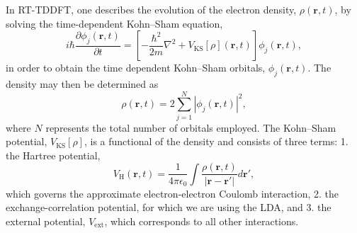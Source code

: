 \documentclass[%
 reprint,
 amsmath,amssymb,
pra,
tightenlines
]{revtex4-1}
\newcommand{\rvec}{\mathbf{r}} %
\newcommand{\rev}[1]{{\color{red} #1}}
\begin{document}



In RT-TDDFT, one describes the evolution of the electron density, $\rho(\rvec,t)$, by solving the time-dependent Kohn--Sham equation, 
\begin{equation}
i\hbar \frac{\partial \phi_j(\rvec, t)}{\partial t} = \left[-\frac{\hbar^2}{2m}\nabla^2 + V_\text{KS}[\rho](\rvec, t)\right]\phi_j(\rvec, t),
\label{eq:tdks}
\end{equation}
in order to obtain the time dependent Kohn--Sham orbitals, $\phi_j(\rvec, t)$. The density may then be determined as
\begin{equation}
\rho(\rvec, t) = 2\sum_{j=1}^N |\phi_j(\rvec, t)|^2,
\end{equation}
where $N$ represents the total number of orbitals employed. 
The Kohn--Sham potential, $V_\text{KS}[\rho]$, is a functional of the density and consists of three terms: \rev{1.} the Hartree potential,
\begin{equation}
V_\text{H}(\rvec,t) = \frac{1}{4\pi\epsilon_0}\int \frac{\rho(\rvec, t)}{|\rvec-\rvec'|}d\rvec',
\label{eq:Hartree}
\end{equation}
which governs the approximate electron-electron Coulomb interaction, \rev{2.} the exchange-correlation potential, for which we are using the LDA, and \rev{3.} the external potential, $V_\text{ext}$, which corresponds to all other interactions.
\end{document}
